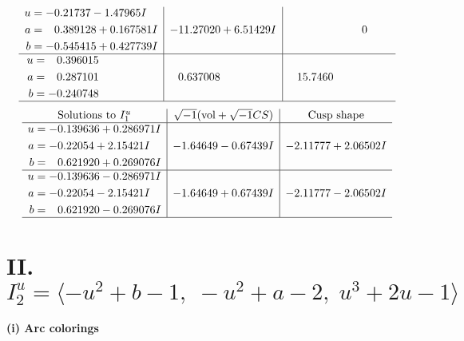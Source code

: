 \documentclass[1p]{elsarticle_modified}
\theoremstyle{definition}
\newcommand{\I}{\sqrt{-1}}
\begin{document}
$$\begin{array}{c|c|c}
\begin{aligned}
u &= -0.21737 - 1.47965 I \\
a &= \phantom{-}0.389128 + 0.167581 I \\
b &= -0.545415 + 0.427739 I\end{aligned}
 & -11.27020 + 6.51429 I & \phantom{-0.000000 } 0 \\ \hline\begin{aligned}
u &= \phantom{-}0.396015\phantom{ +0.000000I} \\
a &= \phantom{-}0.287101\phantom{ +0.000000I} \\
b &= -0.240748\phantom{ +0.000000I}\end{aligned}
 & \phantom{-}0.637008\phantom{ +0.000000I} & \phantom{-}15.7460\phantom{ +0.000000I}\\
 \hline 
 \end{array}$$\newpage$$\begin{array}{c|c|c}  
\text{Solutions to }I^u_{1}& \I (\text{vol} + \sqrt{-1}CS) & \text{Cusp shape}\\
 \hline 
\begin{aligned}
u &= -0.139636 + 0.286971 I \\
a &= -0.22054 + 2.15421 I \\
b &= \phantom{-}0.621920 + 0.269076 I\end{aligned}
 & -1.64649 - 0.67439 I & -2.11777 + 2.06502 I \\ \hline\begin{aligned}
u &= -0.139636 - 0.286971 I \\
a &= -0.22054 - 2.15421 I \\
b &= \phantom{-}0.621920 - 0.269076 I\end{aligned}
 & -1.64649 + 0.67439 I & -2.11777 - 2.06502 I\\
 \hline 
 \end{array}$$\newpage\newpage\renewcommand{\arraystretch}{1}
\centering \section*{II. $I^u_{2}= \langle - u^2+b-1,\;- u^2+a-2,\;u^3+2 u-1 \rangle$}
\flushleft \textbf{(i) Arc colorings}\\
\end{document}
